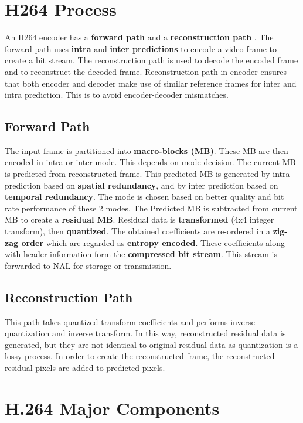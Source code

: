 \section{H264 Process}
An H264 encoder has a \textbf{forward path} and a \textbf{reconstruction path} \cite{sahin2006efficient}. The forward path uses \textbf{intra} and \textbf{inter predictions} to encode a video frame to create a bit stream. The reconstruction path is used to decode the encoded frame and to reconstruct the decoded frame. Reconstruction path in encoder ensures that both encoder and decoder make use of similar reference frames for inter and intra prediction. This is to avoid encoder-decoder mismatches. 

\subsection{Forward Path}
The input frame is partitioned into \textbf{macro-blocks (MB)}. These MB are then encoded in intra or inter mode. This depends on mode decision. The current MB is predicted from reconstructed frame. This predicted MB is generated by intra prediction based on \textbf{spatial redundancy}, and by inter prediction based on \textbf{temporal redundancy}. The mode is chosen based on better quality and bit rate performance of these 2 modes. The Predicted MB is subtracted from current MB to create a \textbf{residual MB}. Residual data is \textbf{transformed} (4x4 integer transform), then \textbf{quantized}. The obtained coefficients are re-ordered in a \textbf{zig-zag order} which are regarded as \textbf{entropy encoded}. These coefficients along with header information form the \textbf{compressed bit stream}. This stream is forwarded to NAL for storage or transmission. 

\subsection{Reconstruction Path}
This path takes quantized transform coefficients and performs inverse quantization and inverse transform. In this way, reconstructed residual data is generated, but they are not identical to original residual data as quantization is a lossy process. In order to create the reconstructed frame, the reconstructed residual pixels are added to predicted pixels. 

\section{H.264 Major Components}

